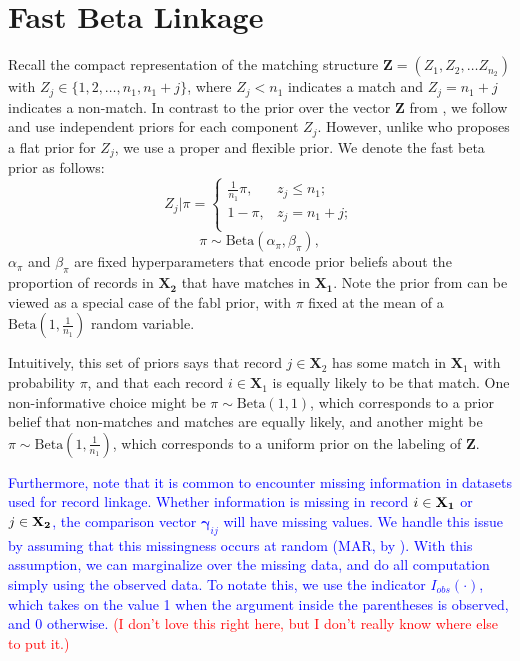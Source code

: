 \documentclass[ba]{imsart}
\begin{document}
\section{Fast Beta Linkage}
\label{sec:fast-beta-linkage}

Recall the compact representation of the matching structure $\bm{Z} = (Z_1, Z_2, \ldots Z_{n_2})$ with $Z_j \in \{1,2, \ldots, n_1, n_1 + j\}$, where $Z_j < n_1$ indicates a match and $Z_j = n_1 + j$ indicates a non-match. In contrast to the prior over the vector $\bm{Z}$ from \cite{sadinle_bayesian_2017}, we follow \cite{wortman2019} and use independent priors for each component $Z_j$. However, unlike \cite{wortman2019} who proposes a flat prior for $Z_j$, we use a proper and flexible prior. We denote the fast beta prior as follows:
$$Z_j | \pi =
\begin{cases} 
	\frac{1}{n_1}\pi,  & z_j \leq n_1; \\
	1-\pi, &  z_j  = n_1 + j; \\
\end{cases}$$
$$\pi \sim \text{Beta}(\alpha_{\pi}, \beta_{\pi}),$$
$\alpha_{\pi}$ and $\beta_{\pi}$ are fixed hyperparameters that encode prior beliefs about  the proportion of records in $\bm{X_2}$ that have matches in $\bm{X_1}.$ Note the prior from \cite{wortman2019} can be viewed as a special case of the fabl prior, with $\pi$ fixed at the mean of a $\text{Beta}\left(1, \frac{1}{n_1}\right)$ random variable. 

\begin{remark}
Intuitively, this set of priors says that record $j \in \bm{X}_2$ has some match in $\bm{X}_1$ with probability $\pi$, and that each record $i \in \bm{X}_1$ is equally likely to be that match. One non-informative choice might be \(\pi \sim \text{Beta}(1, 1)\), which corresponds to a prior belief that non-matches and matches are equally likely, and another might be \(\pi \sim \text{Beta}\left(1, \frac{1}{n_1}\right)\), which corresponds to a uniform prior on the labeling of \(\bm{Z}\). 
\end{remark}

\textcolor{blue}{Furthermore, note that it is common to encounter missing information in datasets used for record linkage. Whether information is missing in record $i \in \bf{X}_1$ or $j \in \bf{X}_2$, the comparison vector $\mathbf{\gamma}_{ij}$ will have missing values. We handle this issue by assuming that this missingness occurs at random (MAR, by \cite{LittleRubin2002}). With this assumption, we can marginalize over the missing data, and do all computation simply using the observed data. To notate this, we use the indicator $I_{obs}(\cdot)$, which takes on the value 1 when the argument inside the parentheses is observed, and 0 otherwise.}
\textcolor{red}{(I don't love this right here, but I don't really know where else to put it.)}
\end{document}
